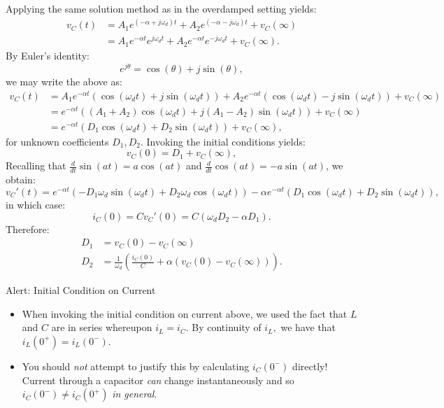 \documentclass[twoside]{article}
\begin{document}
Applying the same solution method as in the overdamped setting yields:
\begin{align*}
    v_{C}(t) &= A_{1}e^{(-\alpha + j\omega_{d})t} + A_{2}e^{(-\alpha - j\omega_{d})t} + v_{C}(\infty)\\
             &= A_{1}e^{-\alpha t}e^{j\omega_{d}t} + A_{2}e^{-\alpha t}e^{-j\omega_{d}t} + v_{C}(\infty).
\end{align*}
By Euler's identity:
\[
    e^{j\theta} = \cos(\theta) + j\sin(\theta),
\]
we may write the above as:
\begin{align*}
    v_{C}(t) &= A_{1}e^{-\alpha t}(\cos(\omega_{d}t) + j\sin(\omega_{d}t)) + A_{2}e^{-\alpha t}(\cos(\omega_{d}t) - j\sin(\omega_{d}t)) + v_{C}(\infty) \\
             &= e^{-\alpha t}\left((A_{1} + A_{2})\cos(\omega_{d}t) + j(A_{1} - A_{2})\sin(\omega_{d}t)\right) + v_{C}(\infty) \\
             &= e^{-\alpha t}\left(D_{1}\cos(\omega_{d}t) + D_{2}\sin(\omega_{d}t)\right) + v_{C}(\infty),
\end{align*}
for unknown coefficients $D_{1},D_{2}$. Invoking the initial conditions yields:
\[
    v_{C}(0) = D_{1} + v_{C}(\infty),
\]
Recalling that $\frac{d}{dt}\sin(at) = a\cos(at)$ and $\frac{d}{dt}\cos(at) = -a\sin(at)$, we obtain:
\[
    v_{C}'(t) = e^{-\alpha t}\left(-D_{1}\omega_{d}\sin(\omega_{d}t) + D_{2}\omega_{d}\cos(\omega_{d}t)\right) - \alpha e^{-\alpha t}\left(D_{1}\cos(\omega_{d}t) + D_{2}\sin(\omega_{d}t)\right),
\]
in which case:
\[
    i_{C}(0) = Cv_{C}'(0) = C(\omega_{d}D_{2} - \alpha D_{1}).
\]
Therefore:
\begin{align*}
    D_{1} &= v_{C}(0) - v_{C}(\infty) \\
    D_{2} &= \frac{1}{\omega_{d}}\left(\frac{i_{C}(0)}{C} + \alpha\left(v_{C}(0) - v_{C}(\infty)\right)\right).
\end{align*}
\begin{redbox}{Alert: Initial Condition on Current}
\begin{itemize}
    \item When invoking the initial condition on current above, we used the fact that $L$ and $C$ are in series whereupon $i_{L} = i_{C}$. By continuity of $i_{L},$ we have that $i_{L}(0^{+}) = i_{L}(0^{-})$.
    \item You should \emph{not} attempt to justify this by calculating $i_{C}(0^{-})$ directly! Current through a capacitor \emph{can} change instantaneously and so $i_{C}(0^{-}) \neq i_{C}(0^{+})$ \emph{in general}.
\end{itemize}
\end{redbox}
\end{document}
